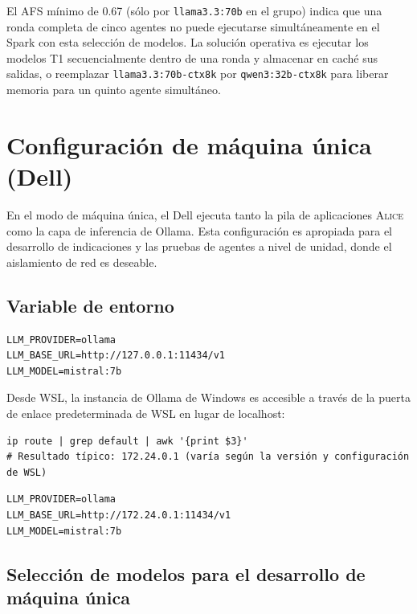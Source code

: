 \noindent El AFS mínimo de 0.67 (sólo por \texttt{llama3.3:70b} en el
grupo) indica que una ronda completa de cinco agentes no puede
ejecutarse simultáneamente en el Spark con esta selección de modelos. La
solución operativa es ejecutar los modelos T1 secuencialmente dentro de
una ronda y almacenar en caché sus salidas, o reemplazar
\texttt{llama3.3:70b-ctx8k} por \texttt{qwen3:32b-ctx8k} para liberar
memoria para un quinto agente simultáneo.

\section{Configuración de máquina única (Dell)}
\label{sec:single}

En el modo de máquina única, el Dell ejecuta tanto la pila de aplicaciones
\textsc{Alice} como la capa de inferencia de Ollama. Esta configuración es
apropiada para el desarrollo de indicaciones y las pruebas de agentes a
nivel de unidad, donde el aislamiento de red es deseable.

\subsection{Variable de entorno}

\begin{lstlisting}[style=bashstyle, caption={.env para el modo de máquina única}]
LLM_PROVIDER=ollama
LLM_BASE_URL=http://127.0.0.1:11434/v1
LLM_MODEL=mistral:7b
\end{lstlisting}

Desde WSL, la instancia de Ollama de Windows es accesible a través de la
puerta de enlace predeterminada de WSL en lugar de localhost:

\begin{lstlisting}[style=bashstyle, caption={Encontrar la IP de la puerta de enlace de Windows desde WSL}]
ip route | grep default | awk '{print $3}'
# Resultado típico: 172.24.0.1 (varía según la versión y configuración de WSL)
\end{lstlisting}

\begin{lstlisting}[style=bashstyle, caption={.env para WSL accediendo a Ollama de Windows}]
LLM_PROVIDER=ollama
LLM_BASE_URL=http://172.24.0.1:11434/v1
LLM_MODEL=mistral:7b
\end{lstlisting}

\subsection{Selección de modelos para el desarrollo de máquina única}

